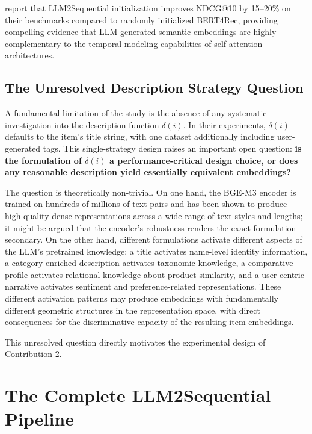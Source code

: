 \documentclass[12pt,a4paper]{report}
\newcommand{\textcite}[1]{\citet{#1}}
\begin{document}
\textcite{boz2025improving} report that LLM2Sequential initialization
improves NDCG@10 by 15--20\% on their benchmarks compared to
randomly initialized BERT4Rec, providing compelling evidence that
LLM-generated semantic embeddings are highly complementary to the
temporal modeling capabilities of self-attention architectures.

\subsection{The Unresolved Description Strategy Question}

A fundamental limitation of the \textcite{boz2025improving} study is
the absence of any systematic investigation into the description
function $\delta(i)$. In their experiments, $\delta(i)$ defaults to
the item's title string, with one dataset additionally including
user-generated tags. This single-strategy design raises an important
open question: \textbf{is the formulation of $\delta(i)$ a
performance-critical design choice, or does any reasonable description
yield essentially equivalent embeddings?}

The question is theoretically non-trivial. On one hand, the BGE-M3
encoder is trained on hundreds of millions of text pairs and has
been shown to produce high-quality dense representations across a
wide range of text styles and lengths; it might be argued that the
encoder's robustness renders the exact formulation secondary.
On the other hand, different formulations activate different
aspects of the LLM's pretrained knowledge: a title activates
name-level identity information, a category-enriched description
activates taxonomic knowledge, a comparative profile activates
relational knowledge about product similarity, and a user-centric
narrative activates sentiment and preference-related representations.
These different activation patterns may produce embeddings with
fundamentally different geometric structures in the representation
space, with direct consequences for the discriminative capacity of
the resulting item embeddings.

This unresolved question directly motivates the experimental
design of Contribution 2.


\section{The Complete LLM2Sequential Pipeline}
\label{sec:pipeline}
\end{document}
